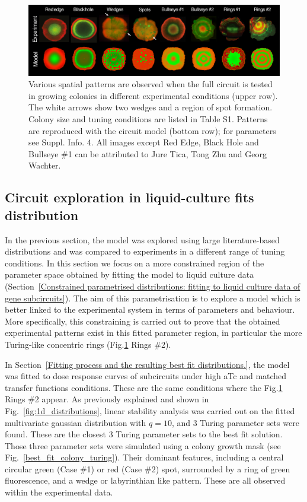 \begin{figure}[H]
    \centering

    \includegraphics[width=1\textwidth]{chapters/Chapter 3/comparison_colonies_model_vs_experiment}
    \caption{Various spatial patterns are observed when the full circuit is tested in growing colonies in different experimental conditions (upper row). The white arrows show two wedges and a region of spot formation. Colony size and tuning conditions are listed in Table S1. Patterns are reproduced with the circuit model (bottom row); for parameters see Suppl. Info. 4. All images except Red Edge, Black Hole and Bullseye \#1 can be attributed to Jure Tica, Tong Zhu and Georg Wachter. }
    \label{comparison_colonies_model_vs_experiment}
\end{figure} %


\subsection{Circuit exploration in liquid-culture fits distribution}
In the previous section, the model was explored using large literature-based distributions and was compared to experiments in a different range of tuning conditions.
In this section we focus on a more constrained region of the parameter space obtained by fitting the model to liquid culture data (Section~\ref{Constrained parametrised distributions: fitting to liquid culture data of gene subcircuits}).
The aim of this parametrisation is to explore a model which is better linked to the experimental system in terms of parameters and behaviour.
More specifically, this constraining is carried out to prove that the obtained experimental patterns exist in this fitted parameter region, in particular the more Turing-like concentric rings (Fig.\ref{comparison_colonies_model_vs_experiment} Rings \#2).


In Section~\ref{Fitting process and the resulting best fit distributions.}, the model was fitted to dose response curves of subcircuits under high aTc and matched transfer functions conditions.
These are the same conditions where the Fig.\ref{comparison_colonies_model_vs_experiment} Rings \#2 appear.
As previously explained and shown in Fig.~\ref{fig:1d_distributions}, linear stability analysis was carried out on the fitted multivariate gaussian distribution with $q=10$, and 3 Turing parameter sets were found.
These are the closest 3 Turing parameter sets to the best fit solution.
Those three parameter sets were simulated using a colony growth mask (see Fig.~\ref{best_fit_colony_turing}). %
Their dominant features, including a central circular green (Case \#1) or red (Case \#2) spot, surrounded by a ring of green fluorescence, and a wedge or labyrinthian like pattern.
These are all observed within the experimental data. %

